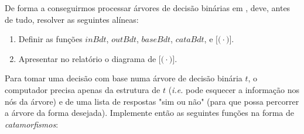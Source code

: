 \documentclass[a4paper]{article}
\newcommand{\Varid}[1]{\mathit{#1}}
\def\ana#1{\mathopen{[\!(}#1\mathclose{)\!]}}
\begin{document}
De forma a conseguirmos processar árvores de decisão binárias em \Haskell,
deve, antes de tudo, resolver as seguintes alíneas:
\begin{enumerate}
  \item Definir as funções \ensuremath{\Varid{inBdt}}, \ensuremath{\Varid{outBdt}}, \ensuremath{\Varid{baseBdt}}, \ensuremath{\Varid{cataBdt}}, e \ensuremath{\ana{\cdot }}.
  \item Apresentar no relatório o diagrama de \ensuremath{\ana{\cdot }}.
\end{enumerate}
Para tomar uma decisão com base numa árvore de decisão binária \ensuremath{\Varid{t}}, o
computador precisa apenas da estrutura de \ensuremath{\Varid{t}} (\emph{i.e.} pode esquecer
a informação nos nós da árvore) e de uma lista de respostas "sim ou não" (para
que possa percorrer a árvore da forma desejada). Implemente então as seguintes
funções na forma de \emph{catamorfismos}:
\end{document}
